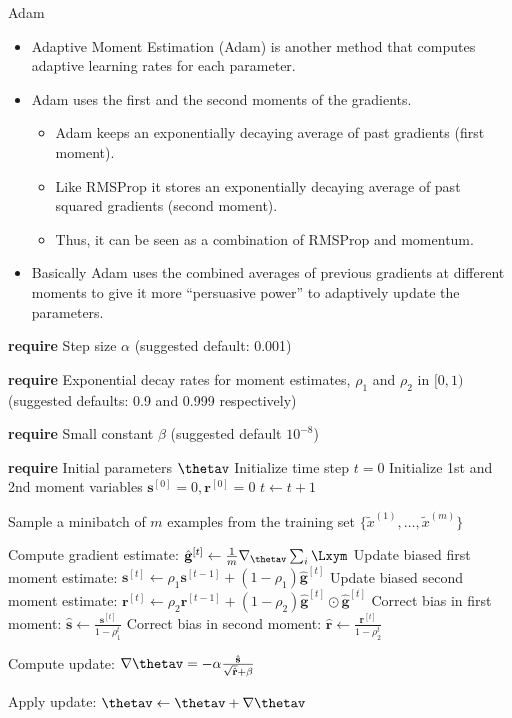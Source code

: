 \documentclass[11pt,compress,t,notes=noshow, xcolor=table]{beamer}
\begin{document}
\begin{vbframe}{Adam}
  \begin{itemize}
    \item Adaptive Moment Estimation (Adam) is another method that computes adaptive learning rates for each parameter.
    \item Adam uses the first and the second moments of the gradients.
      \begin{itemize}
        \item Adam keeps an exponentially decaying average of past gradients (first moment).
        \item Like RMSProp it stores an exponentially decaying average of past squared gradients (second moment).
        \item Thus, it can be seen as a combination of RMSProp and momentum.
      \end{itemize}
    \item Basically Adam uses the combined averages of previous gradients at different moments to give it more \enquote{persuasive power} to adaptively update the parameters.
  \end{itemize}
  
  
\framebreak

\begin{algorithm}[H]
  \scriptsize 
  \caption{Adam}
  \begin{algorithmic}[1]
  \State \textbf{require} Step size $\alpha$ (suggested default: 0.001) \strut
  \State \parbox[t]{\dimexpr\linewidth-\algorithmicindent}{\textbf{require} Exponential decay rates for moment estimates, $\rho_1$ and $\rho_2$ in $[0,1)$ (suggested defaults: 0.9 and 0.999 respectively)} \strut
  \State \parbox[t]{\dimexpr\linewidth-\algorithmicindent}{\textbf{require} Small constant $\beta$ (suggested default $10^{-8}$) \strut}
  \State \textbf{require} Initial parameters $\thetav$ 
  \State Initialize time step $t = 0$
  \State Initialize 1st and 2nd moment variables $\mathbf{s}^{[0]} = 0, \mathbf{r}^{[0]} = 0$
      \State $t \leftarrow t + 1$
      \State \parbox[t]{\dimexpr\linewidth-\algorithmicindent}{Sample a minibatch of $m$ examples from the training set $\{\tilde{x}^{(1)},\dots,\tilde{x}^{(m)}\}$ \strut}
      \State Compute gradient estimate: $\hat{\mathbf{g}}^{[t]} \leftarrow \frac{1}{m} \nabla_{\thetav} \sum_{i} \Lxym$
      \State Update biased first moment estimate: $\mathbf{s}^{[t]} \leftarrow \rho_1 \mathbf{s}^{[t-1]}  + (1 - \rho_1) \hat{\mathbf{g}}^{[t]}$
      \State Update biased second moment estimate: $\mathbf{r}^{[t]} \leftarrow \rho_2 \mathbf{r}^{[t-1]}  + (1 - \rho_2) \hat{\mathbf{g}}^{[t]} \odot \hat{\mathbf{g}}^{[t]}$
      \State Correct bias in first moment: $\hat{\mathbf{s}} \leftarrow \frac{\mathbf{s}^{[t]} }{1-\rho_1^t}$
      \State Correct bias in second moment: $\hat{\mathbf{r}} \leftarrow \frac{\mathbf{r}^{[t]} }{1-\rho_2^t}$
      \State \parbox[t]{\dimexpr\linewidth-\algorithmicindent}{Compute update: $\nabla\thetav = - \alpha \frac{\hat{\mathbf{s}}}{\sqrt{\hat{\mathbf{r}}} + \beta}$ \strut}
      \State Apply update: $\thetav \leftarrow \thetav + \nabla\thetav$
      

\end{algorithmic}
\end{algorithm}
\end{vbframe}
\end{document}
